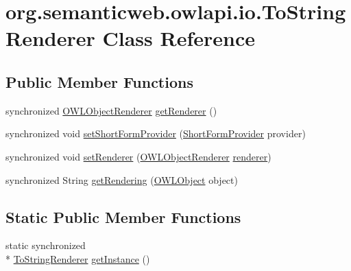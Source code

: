 \hypertarget{classorg_1_1semanticweb_1_1owlapi_1_1io_1_1_to_string_renderer}{\section{org.\-semanticweb.\-owlapi.\-io.\-To\-String\-Renderer Class Reference}
\label{classorg_1_1semanticweb_1_1owlapi_1_1io_1_1_to_string_renderer}
}
\subsection*{Public Member Functions}
\begin{DoxyCompactItemize}
\item 
synchronized \hyperlink{interfaceorg_1_1semanticweb_1_1owlapi_1_1io_1_1_o_w_l_object_renderer}{O\-W\-L\-Object\-Renderer} \hyperlink{classorg_1_1semanticweb_1_1owlapi_1_1io_1_1_to_string_renderer_aa3716156e700f1bc345d0a15376cb466}{get\-Renderer} ()
\item 
synchronized void \hyperlink{classorg_1_1semanticweb_1_1owlapi_1_1io_1_1_to_string_renderer_af90502f02080e38c87439a8834d83cfe}{set\-Short\-Form\-Provider} (\hyperlink{interfaceorg_1_1semanticweb_1_1owlapi_1_1util_1_1_short_form_provider}{Short\-Form\-Provider} provider)
\item 
synchronized void \hyperlink{classorg_1_1semanticweb_1_1owlapi_1_1io_1_1_to_string_renderer_a1765934c5a778cf244dc3abb7974fdcd}{set\-Renderer} (\hyperlink{interfaceorg_1_1semanticweb_1_1owlapi_1_1io_1_1_o_w_l_object_renderer}{O\-W\-L\-Object\-Renderer} \hyperlink{classorg_1_1semanticweb_1_1owlapi_1_1io_1_1_to_string_renderer_ab952a28fb0945e2b724a6fb549f47cd8}{renderer})
\item 
synchronized String \hyperlink{classorg_1_1semanticweb_1_1owlapi_1_1io_1_1_to_string_renderer_a57261647500fbb93b07b5d613c0e139e}{get\-Rendering} (\hyperlink{interfaceorg_1_1semanticweb_1_1owlapi_1_1model_1_1_o_w_l_object}{O\-W\-L\-Object} object)
\end{DoxyCompactItemize}
\subsection*{Static Public Member Functions}
\begin{DoxyCompactItemize}
\item 
static synchronized \\*
\hyperlink{classorg_1_1semanticweb_1_1owlapi_1_1io_1_1_to_string_renderer}{To\-String\-Renderer} \hyperlink{classorg_1_1semanticweb_1_1owlapi_1_1io_1_1_to_string_renderer_afb4857c5a50a0d55d8a8a38aa9c10765}{get\-Instance} ()
\end{DoxyCompactItemize}
